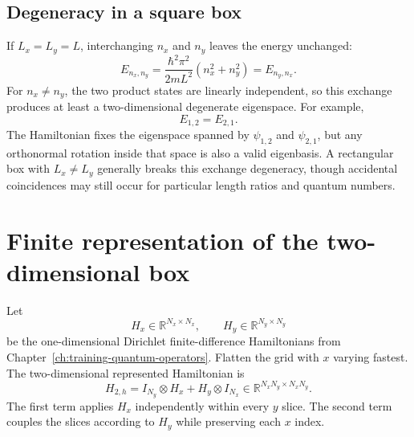 \subsection{Degeneracy in a square box}

If \(L_x=L_y=L\), interchanging \(n_x\) and \(n_y\) leaves the energy
unchanged:
\begin{equation}
  E_{n_x,n_y}
  =\frac{\hbar^2\pi^2}{2mL^2}
   \left(n_x^2+n_y^2\right)
  =E_{n_y,n_x}.
\end{equation}
For \(n_x\neq n_y\), the two product states are linearly independent, so this
exchange produces at least a two-dimensional degenerate eigenspace. For
example,
\begin{equation}
  E_{1,2}=E_{2,1}.
\end{equation}
The Hamiltonian fixes the eigenspace spanned by
\(\psi_{1,2}\) and \(\psi_{2,1}\), but any orthonormal rotation inside that
space is also a valid eigenbasis. A rectangular box with \(L_x\neq L_y\)
generally breaks this exchange degeneracy, though accidental coincidences may
still occur for particular length ratios and quantum numbers.

\section{Finite representation of the two-dimensional box}

Let
\begin{equation}
  H_x\in\mathbb R^{N_x\times N_x},
  \qquad
  H_y\in\mathbb R^{N_y\times N_y}
\end{equation}
be the one-dimensional Dirichlet finite-difference Hamiltonians from
Chapter~\ref{ch:training-quantum-operators}. Flatten the grid with \(x\)
varying fastest. The two-dimensional represented Hamiltonian is
\begin{equation}
  H_{2,h}
  =I_{N_y}\otimes H_x
   +H_y\otimes I_{N_x}
  \in\mathbb R^{N_xN_y\times N_xN_y}.
\end{equation}
The first term applies \(H_x\) independently within every \(y\) slice. The
second term couples the slices according to \(H_y\) while preserving each
\(x\) index.

